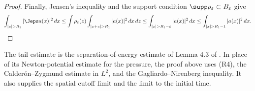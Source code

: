 \documentclass[11pt,reqno]{amsart}
\begin{document}
\begin{proof}
Finally, Jensen's inequality and the support condition
$\supp\rho_\varepsilon\subset B_\varepsilon$ give
\[
  \int_{|x|>R_1}|\Jeps a(x)|^2\,dx
  \leq\int\rho_\varepsilon(z)
       \int_{|x+z|>R_1}|a(x)|^2\,dx\,dz
  \leq\int_{|x|>R_1-\varepsilon}|a(x)|^2\,dx
  \leq\int_{|x|>R_1-1}|a(x)|^2\,dx.
\]
\end{proof}

\begin{remark}
The tail estimate is the separation-of-energy estimate of Lemma 4.3
of \cite{OzanskiPooley2018}. In place of its
Newton-potential estimate for the pressure, the proof above uses (R4), the
Calder\'on--Zygmund estimate in $L^2$, and the Gagliardo--Nirenberg inequality.
It also supplies the spatial cutoff limit and the limit to the initial time.
\end{remark}
\end{document}
